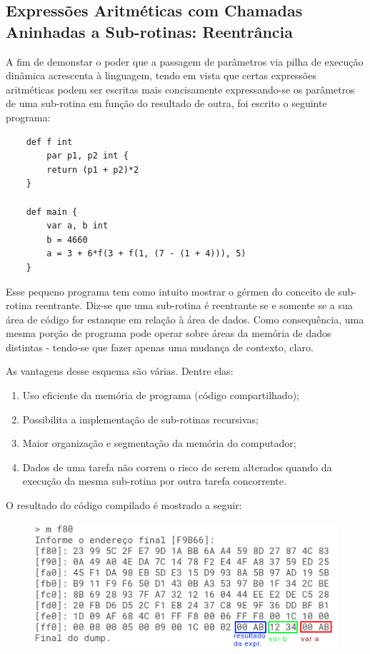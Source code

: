 \documentclass[a4paper,12pt]{report}
\begin{document}
    \subsection*{Expressões Aritméticas com Chamadas Aninhadas a Sub-rotinas: Reentrância}
    A fim de demonstar o poder que a passagem de parâmetros via pilha de execução dinâmica acrescenta à linguagem, tendo em vista que certas expressões aritméticas podem ser escritas mais concisamente expressando-se os parâmetros de uma sub-rotina em função do resultado de outra, foi escrito o seguinte programa:

    \begin{lstlisting}
    def f int
        par p1, p2 int {
        return (p1 + p2)*2
    }

    def main {
        var a, b int
        b = 4660
        a = 3 + 6*f(3 + f(1, (7 - (1 + 4))), 5)
    }
    \end{lstlisting}

    Esse pequeno programa tem como intuito mostrar o gérmen do conceito de sub-rotina reentrante. Diz-se que uma sub-rotina é reentrante se e somente se a sua área de código for estanque em relação à área de dados. Como consequência, uma mesma porção de programa pode operar sobre áreas da memória de dados distintas - tendo-se que fazer apenas  uma mudança de contexto, claro.

    As vantagens desse esquema são várias. Dentre elas:

    \begin{enumerate}
        \item Uso eficiente da memória de programa (código compartilhado);
        \item Possibilita a implementação de sub-rotinas recursivas;
        \item Maior organização e segmentação da memória do computador;
        \item Dados de uma tarefa não correm o risco de serem alterados quando da execução da mesma sub-rotina por outra tarefa concorrente.
    \end{enumerate}

    O resultado do código compilado é mostrado a seguir:

    \begin{figure}[h]
        \centering
        \includegraphics[scale=0.65]{chamada_subrotinas_aninhadas}
    \end{figure}
\end{document}
